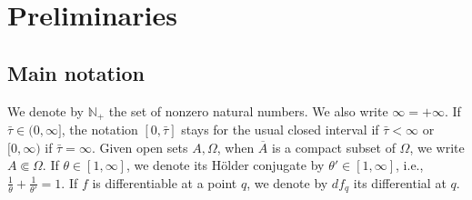 \documentclass[11pt]{amsart}
\newcommand{\Om}{\Omega}
\theoremstyle{plain}
\theoremstyle{definition}
\theoremstyle{remark}
\numberwithin{equation}{section}
\begin{document}
\section{Preliminaries} \label{sec_preliminaries}
\subsection{Main notation}
We denote by $\mathbb{N}_+$ the set of nonzero natural numbers. We also write $\infty=+\infty$. If $\bar{\tau} \in (0,\infty]$, the notation $[0,\bar{\tau}]$ stays for the usual closed interval if $\bar{\tau}<\infty$ or $[0,\infty)$ if $\bar{\tau}=\infty$. Given open sets $A,\Om$, when $\overline{A}$ is a compact subset of $\Om$, we write $A\Subset\Om$. If $\theta \in [1,\infty]$, we denote its H\"older conjugate by $\theta'\in [1,\infty]$, i.e., $\frac{1}{\theta}+\frac{1}{\theta'}=1$. 
If $f$ is differentiable at a point $q$, we denote by $df_q$ its differential at $q$.
\end{document}
